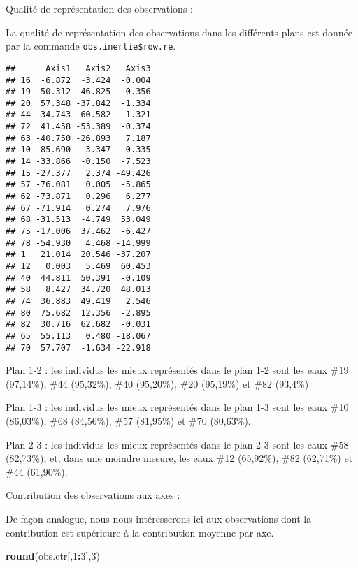 \documentclass[]{article}
\newenvironment{Shaded}{\begin{snugshade}}{\end{snugshade}}
\newcommand{\KeywordTok}[1]{\textcolor[rgb]{0.13,0.29,0.53}{\textbf{#1}}}
\newcommand{\DecValTok}[1]{\textcolor[rgb]{0.00,0.00,0.81}{#1}}
\newcommand{\OperatorTok}[1]{\textcolor[rgb]{0.81,0.36,0.00}{\textbf{#1}}}
\newcommand{\NormalTok}[1]{#1}
\begin{document}
Qualité de représentation des observations :

La qualité de représentation des observations dans les différents plans
est donnée par la commande \texttt{obs.inertie\$row.re}.

\begin{Shaded}
\end{Shaded}

\begin{verbatim}
##      Axis1   Axis2   Axis3
## 16  -6.872  -3.424  -0.004
## 19  50.312 -46.825   0.356
## 20  57.348 -37.842  -1.334
## 44  34.743 -60.582   1.321
## 72  41.458 -53.389  -0.374
## 63 -40.750 -26.893   7.187
## 10 -85.690  -3.347  -0.335
## 14 -33.866  -0.150  -7.523
## 15 -27.377   2.374 -49.426
## 57 -76.081   0.005  -5.865
## 62 -73.871   0.296   6.277
## 67 -71.914   0.274   7.976
## 68 -31.513  -4.749  53.049
## 75 -17.006  37.462  -6.427
## 78 -54.930   4.468 -14.999
## 1   21.014  20.546 -37.207
## 12   0.003   5.469  60.453
## 40  44.811  50.391  -0.109
## 58   8.427  34.720  48.013
## 74  36.883  49.419   2.546
## 80  75.682  12.356  -2.895
## 82  30.716  62.682  -0.031
## 65  55.113   0.480 -18.067
## 70  57.707  -1.634 -22.918
\end{verbatim}

Plan 1-2 : les individus les mieux représentés dans le plan 1-2 sont les
eaux \#19 (97,14\%), \#44 (95,32\%), \#40 (95,20\%), \#20 (95,19\%) et
\#82 (93,4\%)

Plan 1-3 : les individus les mieux représentés dans le plan 1-3 sont les
eaux \#10 (86,03\%), \#68 (84,56\%), \#57 (81,95\%) et \#70 (80,63\%).

Plan 2-3 : les individus les mieux représentés dans le plan 2-3 sont les
eaux \#58 (82,73\%), et, dans une moindre mesure, les eaux \#12
(65,92\%), \#82 (62,71\%) et \#44 (61,90\%).

Contribution des observations aux axes :

De façon analogue, nous nous intéresserons ici aux observations dont la
contribution est supérieure à la contribution moyenne par axe.

\begin{Shaded}
\begin{Highlighting}[]
\KeywordTok{round}\NormalTok{(obs.ctr[,}\DecValTok{1}\OperatorTok{:}\DecValTok{3}\NormalTok{],}\DecValTok{3}\NormalTok{)}
\end{Highlighting}
\end{Shaded}
\end{document}
